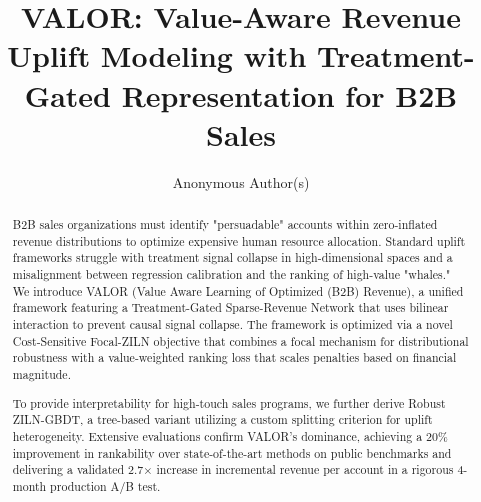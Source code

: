 \documentclass[runningheads]{llncs}
\title{VALOR: Value-Aware Revenue Uplift Modeling with Treatment-Gated Representation for B2B Sales}
\author{Anonymous Author(s)}
\institute{Anonymous Institution \\
\email{anonymous@example.com}}
\begin{document}
\maketitle
\begin{abstract}
B2B sales organizations must identify "persuadable" accounts within zero-inflated revenue distributions to optimize expensive human resource allocation. Standard uplift frameworks struggle with treatment signal collapse in high-dimensional spaces and a misalignment between regression calibration and the ranking of high-value "whales." We introduce VALOR (Value Aware Learning of Optimized (B2B) Revenue), a unified framework featuring a Treatment-Gated Sparse-Revenue Network that uses bilinear interaction to prevent causal signal collapse. The framework is optimized via a novel Cost-Sensitive Focal-ZILN objective that combines a focal mechanism for distributional robustness with a value-weighted ranking loss that scales penalties based on financial magnitude.

To provide interpretability for high-touch sales programs, we further derive Robust ZILN-GBDT, a tree-based variant utilizing a custom splitting criterion for uplift heterogeneity. Extensive evaluations confirm VALOR's dominance, achieving a 20\% improvement in rankability over state-of-the-art methods on public benchmarks and delivering a validated 2.7$\times$ increase in incremental revenue per account in a rigorous 4-month production A/B test.
\end{abstract}








\end{document}
